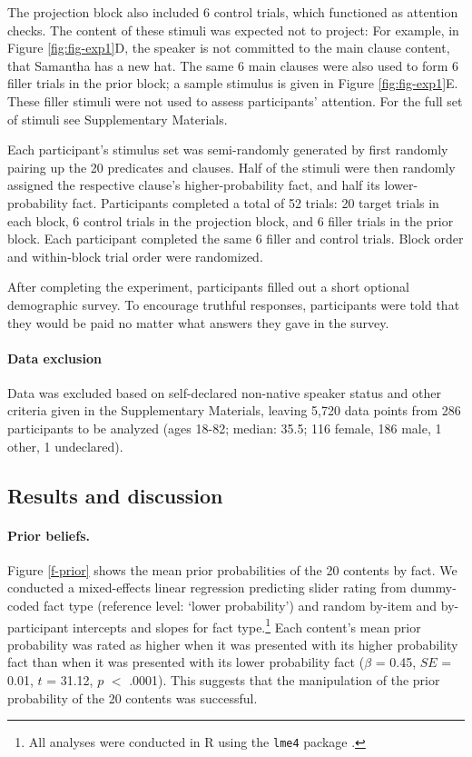 \documentclass[OpenMind]{stjour}
\begin{document}
The projection block also included 6 control trials, which functioned as attention checks. The content of these stimuli was expected not to project: For example, in Figure \ref{fig:fig-exp1}D, the speaker is not committed to the main clause content, that Samantha has a new hat. The same 6 main clauses were also used to form 6 filler trials in the prior block; a sample stimulus is given in Figure \ref{fig:fig-exp1}E. These filler stimuli were not used to assess participants' attention. For the full set of stimuli see Supplementary Materials.


Each participant's stimulus set was semi-randomly generated by first randomly pairing up the 20 predicates and clauses. Half of the stimuli were then randomly assigned the respective clause's higher-probability fact, and half its lower-probability fact. Participants completed a total of 52 trials: 20 target trials in each block, 6 control trials in the projection block, and 6 filler trials in the prior block. Each participant completed the same 6 filler and control trials. Block order and within-block trial order were randomized.



After completing the experiment, participants filled out a short optional demographic survey. To encourage truthful responses, participants were told that they would be paid no matter what answers they gave in the survey.

\paragraph{Data exclusion} Data was excluded based on self-declared non-native speaker status and other criteria given in the Supplementary Materials, leaving 5,720 data points from 286 participants to be analyzed (ages 18-82; median: 35.5; 116 female, 186 male, 1 other, 1 undeclared).

\subsection{Results and discussion}

\paragraph{Prior beliefs.}  Figure \ref{f-prior} shows the mean prior probabilities of the 20 contents by fact. We conducted a  mixed-effects linear regression predicting slider rating from dummy-coded fact type (reference level: `lower probability') and random by-item and by-participant intercepts and slopes for fact type.\footnote{All analyses were conducted in R \citep{R} using the \texttt{lme4} package \citep{lme4}.} Each content's mean prior probability  was rated as higher when it was presented with its higher probability fact than when it was presented with its lower probability fact ($\beta$ = 0.45, $SE$ = 0.01, $t$ = 31.12, $p$ $<$ .0001). This suggests that the manipulation of the prior probability of the 20 contents was successful. 
\end{document}
